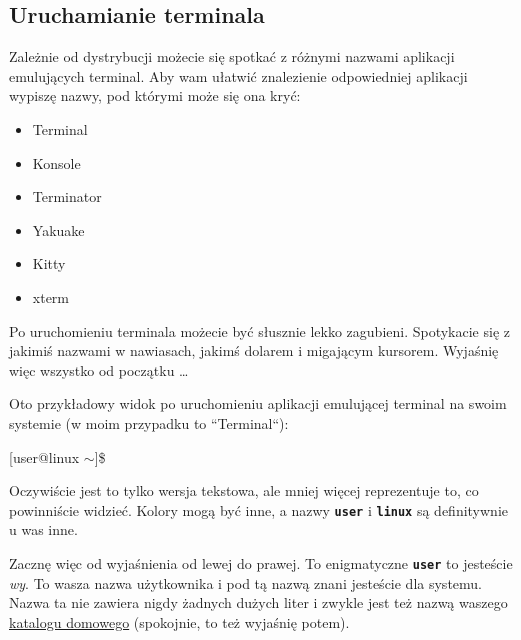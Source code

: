 \documentclass[11pt, a4paper]{article}
\makeatletter
\newcommand{\ttbf}[1]{
    \texttt{\textbf{#1}}
}
\newenvironment{console1}[1][$\sim$]
{
    \begin{tcolorbox}
    \ttfamily
    \fontseries{b}
    \selectfont
    {[}user@linux #1{]}\$ } {
    
    \end{tcolorbox}

}
\makeatother
\begin{document}
\subsection{Uruchamianie terminala}

Zależnie od dystrybucji możecie się spotkać z różnymi nazwami aplikacji emulujących terminal. Aby wam ułatwić znalezienie odpowiedniej aplikacji wypiszę nazwy, pod którymi może się ona kryć:

\begin{minipage}[c]{0.5\textwidth}
    \begin{itemize}
        \item Terminal
        \item Konsole
        \item Terminator
        \item Yakuake
        \item Kitty
        \item xterm
    \end{itemize}
\end{minipage}%
\begin{minipage}[c]{0.5\textwidth}
    \begin{figure}[H]
        \centering
        \quad
        \subfloat['Konsole']{}
        \caption{}
    \end{figure}
\end{minipage}

Po uruchomieniu terminala możecie być słusznie lekko zagubieni. Spotykacie się z jakimiś nazwami w nawiasach, jakimś dolarem i migającym kursorem. Wyjaśnię więc wszystko od początku \dots

Oto przykładowy widok po uruchomieniu aplikacji emulującej terminal na swoim systemie (w moim przypadku to ``Terminal``):

\begin{console1}

\end{console1}

Oczywiście jest to tylko wersja tekstowa, ale mniej więcej reprezentuje to, co powinniście widzieć. Kolory mogą być inne, a nazwy \ttbf{user} i \ttbf{linux} są definitywnie u was inne.

Zacznę więc od wyjaśnienia od lewej do prawej. To enigmatyczne \ttbf{user} to jesteście \emph{wy}. To wasza nazwa użytkownika i pod tą nazwą znani jesteście dla systemu. Nazwa ta nie zawiera nigdy żadnych dużych liter i zwykle jest też nazwą waszego \hyperref[sec:homedir]{katalogu domowego} (spokojnie, to też wyjaśnię potem).
\end{document}
